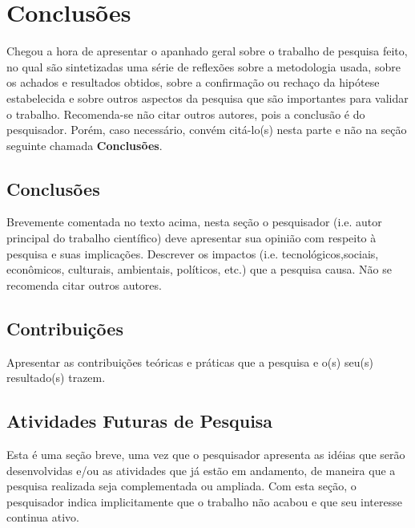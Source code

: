 \chapter{Conclusões}
\label{chapter:consideracoesfinais}

Chegou a hora de apresentar o apanhado geral sobre o trabalho de
pesquisa feito, no qual s\~ao sintetizadas uma s\'erie de
reflex\~oes sobre a metodologia usada, sobre os achados e
resultados obtidos, sobre a confirma\c{c}\~ao ou recha\c{c}o da
hip\'otese estabelecida e sobre outros aspectos da pesquisa que
s\~ao importantes para validar o trabalho. Recomenda-se n\~ao
citar outros autores, pois a conclus\~ao \'e do pesquisador.
Por\'em, caso necess\'ario, conv\'em cit\'a-lo(s) nesta parte e
n\~ao na se\c{c}\~ao seguinte chamada \textbf{Conclus\~oes}.

\section{Conclus\~oes}
\label{section:conclusoes}

Brevemente comentada no texto acima, nesta se\c{c}\~ao o
pesquisador (i.e. autor principal do trabalho cient\'ifico) deve
apresentar sua opini\~ao com respeito \`a pesquisa e suas
implica\c{c}\~oes. Descrever os impactos (i.e.
tecnol\'ogicos,sociais, econ\^omicos, culturais, ambientais,
políticos, etc.) que a pesquisa causa. N\~ao se recomenda citar
outros autores.


\section{Contribui\c{c}\~oes}
\label{section:contribuicoes}

Apresentar as contribui\c{c}\~oes te\'oricas e pr\'aticas que a
pesquisa e o(s) seu(s) resultado(s) trazem.



\section{Atividades Futuras de Pesquisa}
\label{section:atividadesfuturaspesquisa}

Esta \'e uma se\c{c}\~ao breve, uma vez que o pesquisador
apresenta as id\'eias que ser\~ao desenvolvidas e/ou as atividades
que j\'a est\~ao em andamento, de maneira que a pesquisa realizada
seja complementada ou ampliada. Com esta se\c{c}\~ao, o
pesquisador indica implicitamente que o trabalho n\~ao acabou e
que seu interesse continua ativo.
